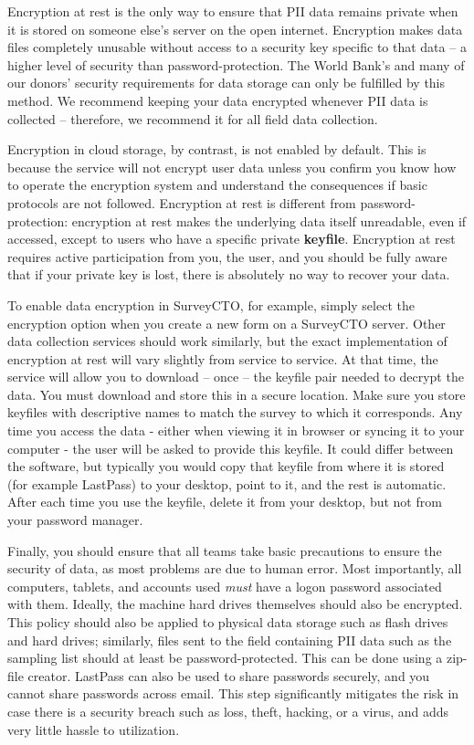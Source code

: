 Encryption at rest is the only way to ensure
that PII data remains private when it is stored
on someone else’s server on the open internet.
Encryption makes data files completely unusable
without access to a security key specific to that data --
a higher level of security than password-protection.
The World Bank’s and many of our donors’ security requirements
for data storage can only be fulfilled by this method.
We recommend keeping your data encrypted whenever PII data is collected --
therefore, we recommend it for all field data collection.

Encryption in cloud storage, by contrast, is not enabled by default.
This is because the service will not encrypt user data unless you confirm
you know how to operate the encryption system and understand the consequences if basic protocols are not followed.
Encryption at rest is different from password-protection:
encryption at rest makes the underlying data itself unreadable,
even if accessed, except to users who have a specific private \textbf{keyfile}.
Encryption at rest requires active participation from you, the user,
and you should be fully aware that if your private key is lost,
there is absolutely no way to recover your data.

To enable data encryption in SurveyCTO, for example,
simply select the encryption option
when you create a new form on a SurveyCTO server.
Other data collection services should work similarly,
but the exact implementation of encryption at rest
will vary slightly from service to service.
At that time, the service will allow you to download -- once --
the keyfile pair needed to decrypt the data.
You must download and store this in a secure location.
Make sure you store keyfiles with descriptive names to match the survey to which it corresponds.
Any time you access the data - either when viewing it in browser or syncing it to your
computer - the user will be asked to provide this keyfile. It could differ between the software,
but typically you would copy that keyfile from where it is stored (for example LastPass)
to your desktop, point to it, and the rest is automatic.
After each time you use the keyfile, delete it from your desktop,
but not from your password manager.

Finally, you should ensure that all teams take basic precautions
to ensure the security of data, as most problems are due to human error.
Most importantly, all computers, tablets, and accounts used
\textit{must} have a logon password associated with them.
Ideally, the machine hard drives themselves should also be encrypted.
This policy should also be applied to physical data storage
such as flash drives and hard drives;
similarly, files sent to the field containing PII data
such as the sampling list should at least be password-protected.
This can be done using a zip-file creator.
LastPass can also be used to share passwords securely,
and you cannot share passwords across email.
This step significantly mitigates the risk in case there is
a security breach such as loss, theft, hacking, or a virus,
and adds very little hassle to utilization.


